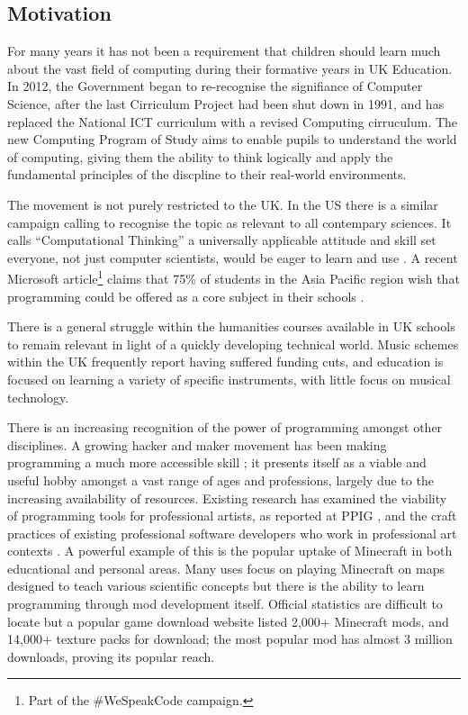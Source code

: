 \documentclass[11pt, abstracton, twoside, titlepage=true]{scrartcl}
\begin{document}
\subsection{Motivation}
For many years it has not been a requirement that children should learn much
about the vast field of computing during their formative years in UK 
Education. In 2012, the Government began to re-recognise the signifiance of 
Computer Science, after the last Cirriculum Project had been shut down in 1991, 
and has replaced the National ICT curriculum with a revised 
Computing cirruculum. The new Computing Program of Study \cite{DfE13} aims to 
enable pupils to understand the world of computing, giving them the ability to 
think logically and apply the fundamental principles of the discpline to their 
real-world environments.

The movement is not purely restricted to the UK. In the US there is a similar 
campaign calling to recognise the topic as relevant to all contempary 
sciences. It calls ``Computational Thinking'' a universally applicable 
attitude and skill set everyone, not just computer scientists, would be eager 
to learn and use \cite{Wing06}. A recent Microsoft article\footnote{Part of the 
\#WeSpeakCode campaign.} claims that 75\% of students in the Asia Pacific region
wish that programming could be offered as a core subject in their schools \cite{micro}.

There is a general struggle within the humanities courses available in UK schools 
to remain relevant in light of a quickly developing technical world. Music schemes 
within the UK frequently report having suffered funding cuts, and education is 
focused on learning a variety of specific instruments, with little focus on 
musical technology.

There is an increasing recognition of the power of programming amongst other 
disciplines. A growing hacker and maker movement has been making programming a 
much more accessible skill \cite{BAD14}; it presents itself as a viable and 
useful hobby amongst a vast range of ages and professions, largely due to the 
increasing availability of resources. Existing research has examined the 
viability of programming tools for professional artists, as reported at PPIG 
\cite{Ch12,BC05}, and the craft practices of existing professional software
developers who work in professional art contexts \cite{W10}. A powerful example 
of this is the popular uptake of Minecraft in both educational and personal areas. 
Many uses focus on playing Minecraft on maps designed to teach various scientific 
concepts\cite{mine1,mine2} but there is the ability to learn programming through 
mod development itself. Official statistics are difficult to locate but a popular 
game download website listed 2,000+ Minecraft mods, and 14,000+ texture packs for 
download; the most popular mod has almost 3 million downloads\cite{crush}, proving 
its popular reach. 
\end{document}
